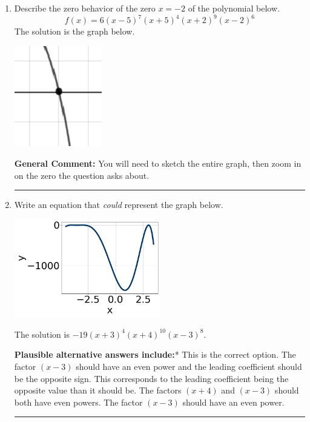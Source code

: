 \documentclass{extbook}[14pt]
\newcommand{\litem}[1]{\item #1

\rule{\textwidth}{0.4pt}}
\begin{document}
\begin{enumerate}\litem{
Describe the zero behavior of the zero $x = -2$ of the polynomial below.
\[ f(x) = 6(x - 5)^{7}(x + 5)^{4}(x + 2)^{9}(x - 2)^{6} \]The solution is the graph below.
    \begin{center}
        \includegraphics[width=0.3\textwidth]{../Figures/polyZeroBehaviorAB.png}
    \end{center}

\textbf{General Comment:} You will need to sketch the entire graph, then zoom in on the zero the question asks about.
}
\litem{
Write an equation that \textit{could} represent the graph below.

\begin{center}
    \includegraphics[width=0.5\textwidth]{../Figures/polyGraphToFunctionB.png}
\end{center}


The solution is \( -19(x + 3)^{4} (x + 4)^{10} (x - 3)^{8} \).\begin{enumerate}[label=\Alph*.]
\textbf{Plausible alternative answers include:}* This is the correct option.
The factor $(x - 3)$ should have an even power and the leading coefficient should be the opposite sign.
This corresponds to the leading coefficient being the opposite value than it should be.
The factors $(x + 4)$ and $(x - 3)$ should both have even powers.
The factor $(x - 3)$ should have an even power.
\end{enumerate}

}
\end{enumerate}
\end{document}
